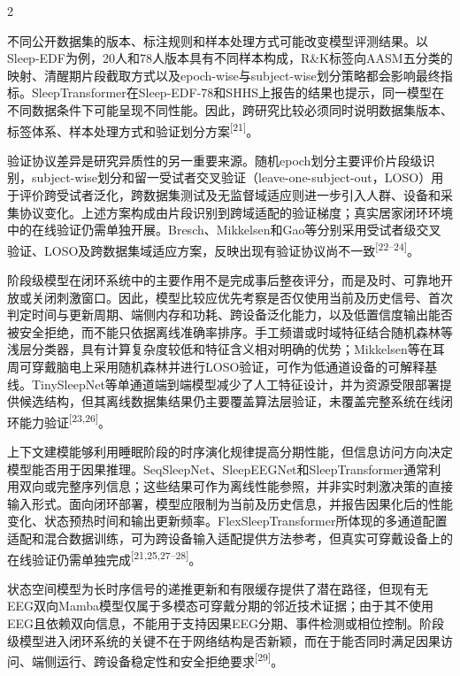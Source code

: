 \documentclass[UTF8,zihao=5,fontset=none]{ctexart}
\newcommand{\song}{\CJKfamily{song}}
\newcommand{\levelthree}[1]{%
  \par\noindent{\song\fontsize{10.5pt}{12.6pt}\selectfont #1}}
\newcommand{\refcite}[1]{\nolinebreak[4]\textsuperscript{[#1]}}
\begin{document}
\begin{multicols}{2}

不同公开数据集的版本、标注规则和样本处理方式可能改变模型评测结果。以Sleep-EDF为例，20人和78人版本具有不同样本构成，R\&K标签向AASM五分类的映射、清醒期片段截取方式以及epoch-wise与subject-wise划分策略都会影响最终指标。SleepTransformer在Sleep-EDF-78和SHHS上报告的结果也提示，同一模型在不同数据条件下可能呈现不同性能。因此，跨研究比较必须同时说明数据集版本、标签体系、样本处理方式和验证划分方案\refcite{21}。\par

验证协议差异是研究异质性的另一重要来源。随机epoch划分主要评价片段级识别，subject-wise划分和留一受试者交叉验证（leave-one-subject-out，LOSO）用于评价跨受试者泛化，跨数据集测试及无监督域适应则进一步引入人群、设备和采集协议变化。上述方案构成由片段识别到跨域适配的验证梯度；真实居家闭环环境中的在线验证仍需单独开展。Bresch、Mikkelsen和Gao等分别采用受试者级交叉验证、LOSO及跨数据集域适应方案，反映出现有验证协议尚不一致\refcite{22--24}。\par

\levelthree{2.2.3 阶段级表征与上下文模型}
阶段级模型在闭环系统中的主要作用不是完成事后整夜评分，而是及时、可靠地开放或关闭刺激窗口。因此，模型比较应优先考察是否仅使用当前及历史信号、首次判定时间与更新周期、端侧内存和功耗、跨设备泛化能力，以及低置信度输出能否被安全拒绝，而不能只依据离线准确率排序。手工频谱或时域特征结合随机森林等浅层分类器，具有计算复杂度较低和特征含义相对明确的优势；Mikkelsen等在耳周可穿戴脑电上采用随机森林并进行LOSO验证，可作为低通道设备的可解释基线。TinySleepNet等单通道端到端模型减少了人工特征设计，并为资源受限部署提供候选结构，但其离线数据集结果仍主要覆盖算法层验证，未覆盖完整系统在线闭环能力验证\refcite{23,26}。\par

上下文建模能够利用睡眠阶段的时序演化规律提高分期性能，但信息访问方向决定模型能否用于因果推理。SeqSleepNet、SleepEEGNet和SleepTransformer通常利用双向或完整序列信息；这些结果可作为离线性能参照，并非实时刺激决策的直接输入形式。面向闭环部署，模型应限制为当前及历史信息，并报告因果化后的性能变化、状态预热时间和输出更新频率。FlexSleepTransformer所体现的多通道配置适配和混合数据训练，可为跨设备输入适配提供方法参考，但真实可穿戴设备上的在线验证仍需单独完成\refcite{21,25,27--28}。\par

状态空间模型为长时序信号的递推更新和有限缓存提供了潜在路径，但现有无EEG双向Mamba模型仅属于多模态可穿戴分期的邻近技术证据；由于其不使用EEG且依赖双向信息，不能用于支持因果EEG分期、事件检测或相位控制。阶段级模型进入闭环系统的关键不在于网络结构是否新颖，而在于能否同时满足因果访问、端侧运行、跨设备稳定性和安全拒绝要求\refcite{29}。\par


\end{multicols}
\end{document}
